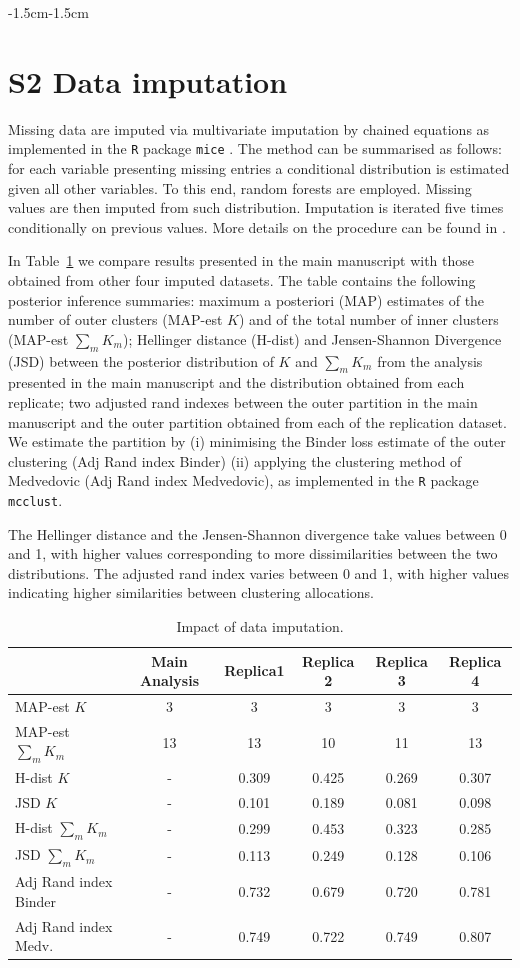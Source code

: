 \documentclass[11pt]{article}
\begin{document}
\begin{changemargin}{-1.5cm}{-1.5cm}
\section*{ S2 Data imputation} \label{ap:dataimpute}
Missing data are imputed via multivariate imputation by chained equations as implemented in the \texttt{R} package \texttt{mice} \cite{mice}.  The method can be summarised as follows:  for each variable presenting missing entries a conditional distribution is estimated given all  other variables. To this end, random forests are employed. Missing values are then imputed from such distribution. Imputation is  iterated five times conditionally on previous values. More details on the procedure can be found in \cite{mice}.

In Table~\ref{tab:imputation} we compare results presented in the main manuscript with those obtained from other four  imputed datasets. The table contains the following posterior inference summaries: maximum a posteriori (MAP)  estimates of  the number of outer clusters (MAP-est $K$) and of the total number of inner clusters (MAP-est $\sum_m K_m$); Hellinger distance (H-dist) and Jensen-Shannon Divergence (JSD) between the posterior distribution of $K$ and $\sum_m K_m$ from the analysis presented in the main manuscript and the distribution obtained from each replicate; two adjusted rand indexes between the outer  partition in the main manuscript and the outer partition obtained from each of the replication dataset. We estimate the partition by (i) minimising the Binder loss estimate of the outer clustering (Adj Rand index Binder) (ii) applying the clustering method of Medvedovic (Adj Rand index Medvedovic), as implemented in the \texttt{R} package \texttt{mcclust}.


The Hellinger distance and the Jensen-Shannon divergence take values between 0 and 1, with higher values corresponding to more dissimilarities between the two distributions. The adjusted rand index varies between 0 and 1, with higher values indicating higher similarities between clustering allocations.

\begin{table}[h] 
	\caption{\label{tab:imputation} Impact of data imputation.}
	\begin{tabular}{l|c|c|c|c|c}
		&Main Analysis& Replica1 & Replica 2 & Replica 3 & Replica 4\\
		\hline
		MAP-est $K$ & 3& 3 & 3 & 3 & 3\\
		MAP-est $\sum_m K_m$&13&13&10&11&13\\
		\hline
		H-dist $K$ & - & 0.309 & 0.425 & 0.269 & 0.307\\
		JSD $K$& - & 0.101&0.189&0.081&0.098\\
		H-dist $\sum_m K_m$ & - & 0.299&0.453&0.323&0.285 \\
		JSD $\sum_m K_m$& - & 0.113 & 0.249&0.128&0.106 \\
		\hline
		Adj Rand index Binder & - & 0.732& 0.679&0.720&0.781\\
		Adj Rand index Medv. & - & 0.749&0.722 & 0.749&0.807\\
	\end{tabular}
\end{table}



\end{changemargin}
\end{document}
